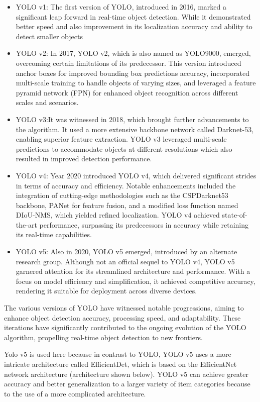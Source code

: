 \begin{itemize}
    \item YOLO v1: The first version of YOLO, introduced in 2016, marked a significant leap forward in real-time object detection. While it demonstrated better speed and also improvement in its localization accuracy and ability to detect smaller objects
    \item YOLO v2: In 2017, YOLO v2, which is also named as YOLO9000, emerged, overcoming certain limitations of its predecessor. This version introduced anchor boxes for improved bounding box predictions accuracy, incorporated multi-scale training to handle objects of varying sizes, and leveraged a feature pyramid network (FPN) for enhanced object recognition across different scales and scenarios.
    \item YOLO v3:It was witnessed in 2018, which brought further advancements to the algorithm. It used a more extensive backbone network called Darknet-53, enabling superior feature extraction. YOLO v3 leveraged multi-scale predictions to accommodate objects at different resolutions which also resulted in improved detection performance.
    \item YOLO v4: Year 2020 introduced YOLO v4, which delivered significant strides in terms of accuracy and efficiency. Notable enhancements included the integration of cutting-edge methodologies such as the CSPDarknet53 backbone, PANet for feature fusion, and a modified loss function named DIoU-NMS, which yielded refined localization. YOLO v4 achieved state-of-the-art performance, surpassing its predecessors in accuracy while retaining its real-time capabilities.
    \item YOLO v5: Also in 2020, YOLO v5 emerged, introduced by an alternate research group. Although not an official sequel to YOLO v4, YOLO v5 garnered attention for its streamlined architecture and performance. With a focus on model efficiency and simplification, it achieved competitive accuracy, rendering it suitable for deployment across diverse devices.
\end{itemize}

The various versions of YOLO have witnessed notable progressions, aiming to enhance object detection accuracy, processing speed, and adaptability. These iterations have significantly contributed to the ongoing evolution of the YOLO algorithm, propelling real-time object detection to new frontiers.

Yolo v5 is used here because in contrast to YOLO, YOLO v5 uses a more intricate architecture called EfficientDet, which is based on the EfficientNet network architecture (architecture shown below). YOLO v5 can achieve greater accuracy and better generalization to a larger variety of item categories because to the use of a more complicated architecture.

